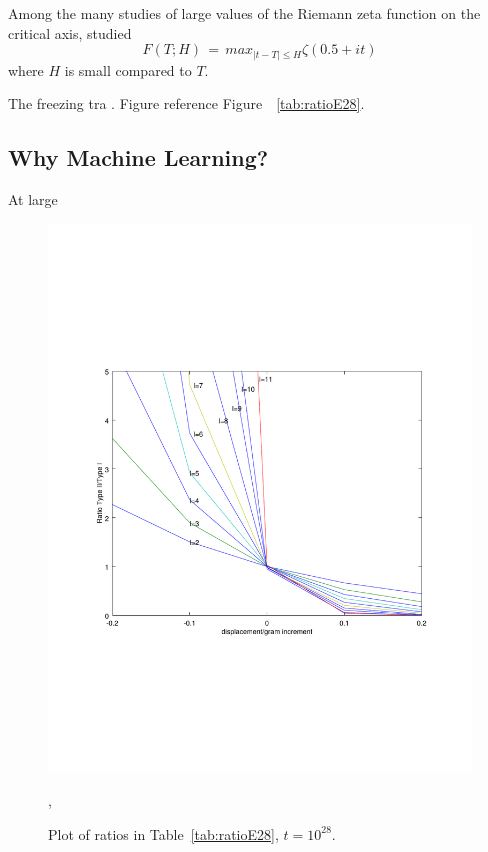 \documentclass[twoside]{article}
\begin{document}
Among the many studies of large values of the Riemann zeta function on the critical axis, 
studied 
\begin{equation}
F(T; H)  \, = \, max_{|t-T| \le H} \zeta ( 0.5+it ) 
\label{eqRie}
\end{equation}
where $H$ is small compared to $T$. 

The freezing tra .  Figure reference Figure~~\ref{tab:ratioE28}.

\subsection{\label{secwhy}Why Machine Learning?}

At large 

\begin{figure}
\includegraphics[width=1.0\textwidth]{typeIIratio.pdf}
\caption[]{ 
 Plot of  ratios in  Table~\ref{tab:ratioE28},  $t = 10^{28}$.
 }
\vspace{1mm}, 
\label{fig:ratioE28}
\end{figure}
\end{document}

